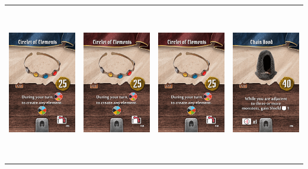 \documentclass{minimal}
\begin{document}
{\begin{longtable}{llll}
\includegraphics[width=44mm,height=68mm]{./64-151/gh-075a-circlet-of-elements.png} &
\includegraphics[width=44mm,height=68mm]{./64-151/gh-075b-circlet-of-elements.png} &
\includegraphics[width=44mm,height=68mm]{./64-151/gh-075b-circlet-of-elements.png} &
\includegraphics[width=44mm,height=68mm]{./64-151/gh-076a-chain-hood.png}\\ 

\end{longtable}}
\end{document}
